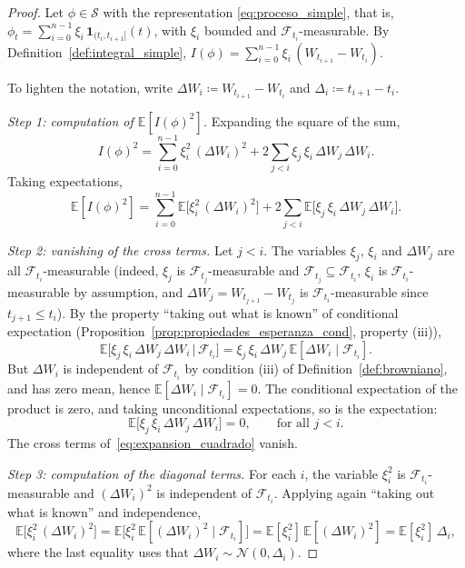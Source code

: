 \documentclass[11pt,a4paper,oneside]{report}
\theoremstyle{plain}
\theoremstyle{definition}
\theoremstyle{remark}
\newcommand{\E}{\mathbb{E}}
\newcommand{\F}{\mathcal{F}}
\newcommand{\1}{\mathbf{1}}
\newcommand{\eqdef}{\coloneqq}
\begin{document}
\begin{proof}
Let $\phi \in \mathcal{S}$ with the representation
\eqref{eq:proceso_simple}, that is,
$\phi_t = \sum_{i=0}^{n-1} \xi_i\, \mathbf{1}_{(t_i, t_{i+1}]}(t)$,
with $\xi_i$ bounded and $\F_{t_i}$-measurable. By
Definition~\ref{def:integral_simple},
$I(\phi) = \sum_{i=0}^{n-1} \xi_i\, (W_{t_{i+1}} - W_{t_i})$.

To lighten the notation, write $\Delta W_i \eqdef W_{t_{i+1}} - W_{t_i}$
and $\Delta_i \eqdef t_{i+1} - t_i$.

\emph{Step 1: computation of $\E[I(\phi)^2]$.} Expanding the square
of the sum,
\begin{equation*}
  I(\phi)^2 = \sum_{i=0}^{n-1} \xi_i^2\, (\Delta W_i)^2
            + 2 \sum_{j < i} \xi_j\, \xi_i\, \Delta W_j\, \Delta W_i.
\end{equation*}
Taking expectations,
\begin{equation}\label{eq:expansion_cuadrado}
  \E[I(\phi)^2]
  = \sum_{i=0}^{n-1} \E\bigl[\xi_i^2\, (\Delta W_i)^2\bigr]
  + 2 \sum_{j < i} \E\bigl[\xi_j\, \xi_i\, \Delta W_j\, \Delta W_i\bigr].
\end{equation}

\emph{Step 2: vanishing of the cross terms.} Let $j < i$. The
variables $\xi_j$, $\xi_i$ and $\Delta W_j$ are all
$\F_{t_i}$-measurable (indeed, $\xi_j$ is $\F_{t_j}$-measurable and
$\F_{t_j} \subseteq \F_{t_i}$, $\xi_i$ is $\F_{t_i}$-measurable by
assumption, and $\Delta W_j = W_{t_{j+1}} - W_{t_j}$ is
$\F_{t_i}$-measurable since $t_{j+1} \leq t_i$). By the property
``taking out what is known'' of conditional expectation
(Proposition~\ref{prop:propiedades_esperanza_cond}, property (iii)),
\begin{equation*}
  \E\bigl[\xi_j\, \xi_i\, \Delta W_j\, \Delta W_i \,\big|\, \F_{t_i}\bigr]
  = \xi_j\, \xi_i\, \Delta W_j\, \E[\Delta W_i \mid \F_{t_i}].
\end{equation*}
But $\Delta W_i$ is independent of $\F_{t_i}$ by condition (iii) of
Definition~\ref{def:browniano}, and has zero mean, hence
$\E[\Delta W_i \mid \F_{t_i}] = 0$. The conditional expectation of the
product is zero, and taking unconditional expectations, so is the
expectation:
\begin{equation*}
  \E\bigl[\xi_j\, \xi_i\, \Delta W_j\, \Delta W_i\bigr] = 0,
  \qquad \text{for all } j < i.
\end{equation*}
The cross terms of~\eqref{eq:expansion_cuadrado} vanish.

\emph{Step 3: computation of the diagonal terms.} For each $i$, the
variable $\xi_i^2$ is $\F_{t_i}$-measurable and $(\Delta W_i)^2$ is
independent of $\F_{t_i}$. Applying again ``taking out what is
known'' and independence,
\begin{equation*}
  \E\bigl[\xi_i^2\, (\Delta W_i)^2\bigr]
  = \E\bigl[\xi_i^2\, \E[(\Delta W_i)^2 \mid \F_{t_i}]\bigr]
  = \E[\xi_i^2]\, \E[(\Delta W_i)^2]
  = \E[\xi_i^2]\, \Delta_i,
\end{equation*}
where the last equality uses that
$\Delta W_i \sim \mathcal{N}(0, \Delta_i)$.


\end{proof}
\end{document}

